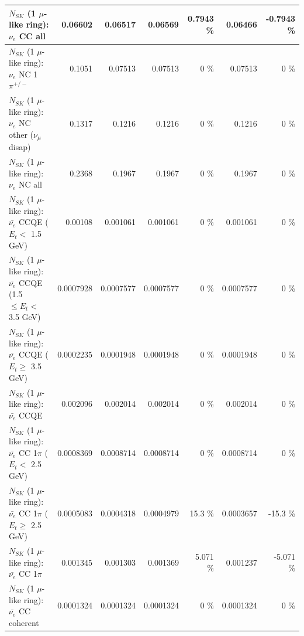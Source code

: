 \begin{table}
\begin{tabular}{| l | r | r | r  r | r  r |}
                                  $N_{SK}$ (1 $\mu$-like ring): $\nu_{e}$ CC all &         0.06602 &         0.06517 &         0.06569 &   0.7943 \%  &         0.06466 &  -0.7943 \%  \\ 
\hline
                           $N_{SK}$ (1 $\mu$-like ring): $\nu_e$ NC 1$\pi^{+/-}$ &          0.1051 &         0.07513 &         0.07513 &        0 \%  &         0.07513 &        0 \%  \\ 
                $N_{SK}$ (1 $\mu$-like ring): $\nu_e$ NC other ($\nu_\mu$ disap) &          0.1317 &          0.1216 &          0.1216 &        0 \%  &          0.1216 &        0 \%  \\ 
                                  $N_{SK}$ (1 $\mu$-like ring): $\nu_{e}$ NC all &          0.2368 &          0.1967 &          0.1967 &        0 \%  &          0.1967 &        0 \%  \\ 
\hline
\hline
\hline
            $N_{SK}$ (1 $\mu$-like ring): $\bar{\nu_e}$ CCQE ($E_{t} <$ 1.5 GeV) &         0.00108 &        0.001061 &        0.001061 &        0 \%  &        0.001061 &        0 \%  \\ 
   $N_{SK}$ (1 $\mu$-like ring): $\bar{\nu_e}$ CCQE (1.5 $\leq E_{t} <$ 3.5 GeV) &       0.0007928 &       0.0007577 &       0.0007577 &        0 \%  &       0.0007577 &        0 \%  \\ 
         $N_{SK}$ (1 $\mu$-like ring): $\bar{\nu_e}$ CCQE ($E_{t} \geq$ 3.5 GeV) &       0.0002235 &       0.0001948 &       0.0001948 &        0 \%  &       0.0001948 &        0 \%  \\ 
\hline
                                $N_{SK}$ (1 $\mu$-like ring): $\bar{\nu_e}$ CCQE &        0.002096 &        0.002014 &        0.002014 &        0 \%  &        0.002014 &        0 \%  \\ 
\hline
       $N_{SK}$ (1 $\mu$-like ring): $\bar{\nu_e}$ CC 1$\pi$ ($E_{t} <$ 2.5 GeV) &       0.0008369 &       0.0008714 &       0.0008714 &        0 \%  &       0.0008714 &        0 \%  \\ 
    $N_{SK}$ (1 $\mu$-like ring): $\bar{\nu_e}$ CC 1$\pi$ ($E_{t} \geq$ 2.5 GeV) &       0.0005083 &       0.0004318 &       0.0004979 &     15.3 \%  &       0.0003657 &    -15.3 \%  \\ 
\hline
                           $N_{SK}$ (1 $\mu$-like ring): $\bar{\nu_e}$ CC 1$\pi$ &        0.001345 &        0.001303 &        0.001369 &    5.071 \%  &        0.001237 &   -5.071 \%  \\ 
                         $N_{SK}$ (1 $\mu$-like ring): $\bar{\nu_e}$ CC coherent &       0.0001324 &       0.0001324 &       0.0001324 &        0 \%  &       0.0001324 &        0 \%  \\ 

\end{tabular}
\end{table}
